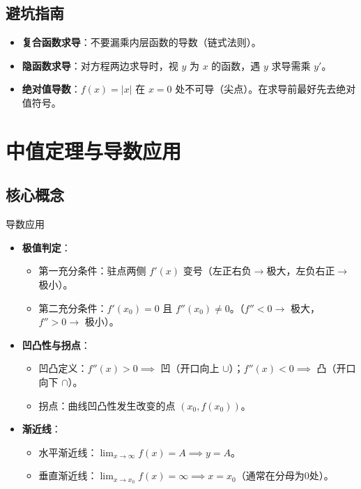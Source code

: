 \documentclass[UTF8, a4paper, 10pt]{ctexart} %
\newenvironment{pitfall}{
    \begin{tcolorbox}[
        colback=yellow!10, 
        colframe=orange!80!black, 
        title=避坑指南, 
        fonttitle=\bfseries\small, 
        arc=1mm,
        left=2pt, right=2pt, top=2pt, bottom=2pt,
        toptitle=1pt, bottomtitle=1pt
    ]
    \begin{itemize}[leftmargin=*, nosep, label=\textcolor{red}{\textbf{!}}]
}{
    \end{itemize}
    \end{tcolorbox}
}
\begin{document}
\subsection{避坑指南}
\begin{pitfall}
    \item \textbf{复合函数求导}：不要漏乘内层函数的导数（链式法则）。
    \item \textbf{隐函数求导}：对方程两边求导时，视 $y$ 为 $x$ 的函数，遇 $y$ 求导需乘 $y'$。
    \item \textbf{绝对值导数}：$f(x)=|x|$ 在 $x=0$ 处不可导（尖点）。在求导前最好先去绝对值符号。
\end{pitfall}

\section{中值定理与导数应用}

\subsection{核心概念}
\begin{concept}{导数应用}
    \begin{itemize}[nosep]
        \item \textbf{极值判定}：
        \begin{itemize}[nosep]
            \item 第一充分条件：驻点两侧 $f'(x)$ 变号（左正右负$\to$极大，左负右正$\to$极小）。
            \item 第二充分条件：$f'(x_0)=0$ 且 $f''(x_0) \neq 0$。（$f''<0 \to$ 极大，$f''>0 \to$ 极小）。
        \end{itemize}
        \item \textbf{凹凸性与拐点}：
        \begin{itemize}[nosep]
            \item 凹凸定义：$f''(x) > 0 \implies$ 凹（开口向上 $\cup$）；$f''(x) < 0 \implies$ 凸（开口向下 $\cap$）。
            \item 拐点：曲线凹凸性发生改变的点 $(x_0, f(x_0))$。
        \end{itemize}
        \item \textbf{渐近线}：
        \begin{itemize}[nosep]
            \item 水平渐近线：$\lim_{x \to \infty} f(x) = A \implies y=A$。
            \item 垂直渐近线：$\lim_{x \to x_0} f(x) = \infty \implies x=x_0$（通常在分母为0处）。
        \end{itemize}
    \end{itemize}
\end{concept}
\end{document}
